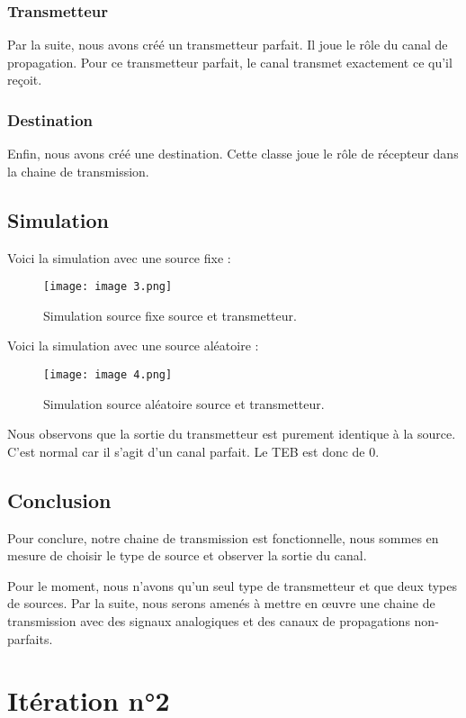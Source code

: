 \subsubsection{Transmetteur}

Par la suite, nous avons créé un transmetteur parfait. Il joue le rôle du canal de propagation. Pour ce transmetteur parfait, le canal transmet exactement ce qu'il reçoit.

\subsubsection{Destination}

Enfin, nous avons créé une destination. Cette classe joue le rôle de récepteur dans la chaine de transmission.

\subsection{Simulation}

Voici la simulation avec une source fixe :
\begin{figure}[h]
    \centering
    \texttt{[image: image 3.png]}
    \caption{\label{fig:image3}Simulation source fixe source et transmetteur.}
\end{figure}

Voici la simulation avec une source aléatoire :
\begin{figure}[h]
    \centering
    \texttt{[image: image 4.png]}
    \caption{\label{fig:image4}Simulation source aléatoire source et transmetteur.}
\end{figure}

Nous observons que la sortie du transmetteur est purement identique à la source. C'est normal car il s'agit d'un canal parfait. Le TEB est donc de 0.

\subsection{Conclusion}

Pour conclure, notre chaine de transmission est fonctionnelle, nous sommes en mesure de choisir le type de source et observer la sortie du canal.

Pour le moment, nous n'avons qu'un seul type de transmetteur et que deux types de sources. Par la suite, nous serons amenés à mettre en œuvre une chaine de transmission avec des signaux analogiques et des canaux de propagations non-parfaits.
\newpage
\section{Itération n°2}
